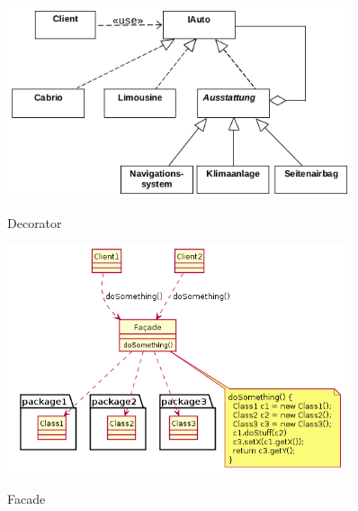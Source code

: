 \begin{figure}[htb]
	\centering
	\begin{minipage}[t]{0.45\linewidth}
		\centering
		\includegraphics[width=0.9\textwidth]{images/decorator}
		\label{fig:decorator}
		\caption{Decorator}
	\end{minipage}%
	\hfill
	\begin{minipage}[t]{0.45\linewidth}
		\centering
		\includegraphics[width=0.9\textwidth]{images/facade}
		\label{fig:facade}
		\caption{Facade}
	\end{minipage}
\end{figure}

